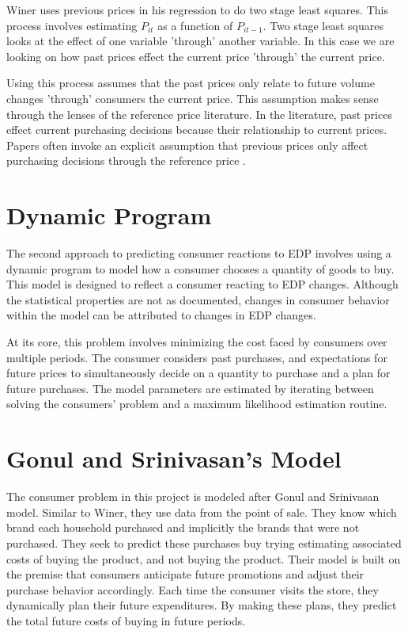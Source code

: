 \documentclass{article}
\begin{document}
Winer uses previous prices in his regression to do two stage least squares. This process involves estimating ${P}_{it}$ as a function of ${P}_{it-1}$. Two stage least squares looks at the effect of one variable 'through' another variable.  In this case we are looking on how past prices effect the current price 'through' the current price. 

Using this process assumes that the past prices only relate to future volume changes 'through' consumers the current price. This assumption makes sense through the lenses of the reference price literature. In the literature, past prices effect current purchasing decisions because their relationship to current prices. Papers often invoke an explicit assumption that previous prices only affect purchasing decisions through the reference price \cite{putler}.

\section{Dynamic Program}


The second approach to predicting consumer reactions to EDP involves using a dynamic program to model how a consumer chooses a quantity of goods to buy. This model is designed to reflect a consumer reacting to EDP changes. Although the statistical properties are not as documented, changes in consumer behavior within the model can be attributed to changes in EDP changes.

At its core, this problem involves minimizing the cost faced by consumers over multiple periods. The consumer considers past purchases, and expectations for future prices to simultaneously decide on a quantity to purchase and a plan for future purchases. The model parameters are estimated by iterating between solving the consumers' problem and a maximum likelihood estimation routine. 

\section{Gonul and Srinivasan's Model}

The consumer problem in this project is modeled after Gonul and Srinivasan model\cite{gonul}. Similar to Winer, they use data from the point of sale. They know which brand each household purchased and implicitly the brands that were not purchased. They seek to predict these purchases buy trying estimating associated costs of buying the product, and not buying the product. Their model is built on the premise that consumers anticipate future promotions and adjust their purchase behavior accordingly. Each time the consumer visits the store, they dynamically plan their future expenditures. By making these plans, they predict the total future costs of buying in future periods.
\end{document}
